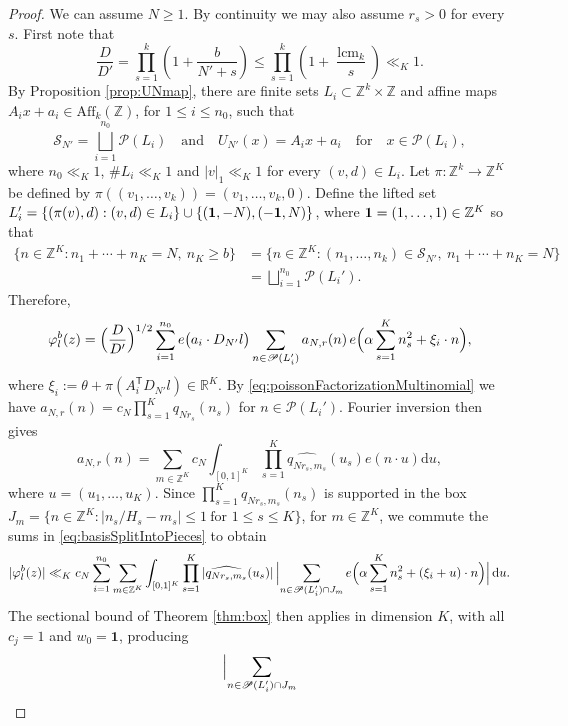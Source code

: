 \documentclass[a4paper,reqno,12pt]{amsart}
\theoremstyle{plain}
\theoremstyle{plain}
\theoremstyle{remark}
\theoremstyle{plain}
\newcommand{\cP}{\mathscr{P}}
\newcommand{\cS}{\mathscr{S}}
\newcommand{\RR}{\mathbb{R}}
\newcommand{\ft}{\widehat}
\newcommand{\al}{\alpha}
\newcommand{\dd}{\mathrm{d}}
\newcommand{\p}{\varphi}
\newcommand{\aff}{\text{Aff}}
\newcommand{\Z}{\mathbb{Z}}
\newcommand{\lcmk}{\operatorname{lcm}_k}
\theoremstyle{plain}
\theoremstyle{plain}
\begin{document}
{\begin{proof}{
We can assume $N\geq1$. {By continuity we may also assume $r_s>0$ for every $s$.}
First note that
\[
\frac{D}{D'}=\prod_{s=1}^k\left(1+\frac{b}{N'+s}\right)
\leq\prod_{s=1}^k\left(1+\frac{\lcmk}{s}\right)\ll_K1.
\]
By Proposition \ref{prop:UNmap}, there are
finite sets $L_i\subset\Z^k\times\Z$ and affine maps
$A_ix+a_i\in\aff_k(\Z)$, for $1\leq i\leq n_0$, such that
\[
\cS_{N'}=\bigsqcup_{i=1}^{n_0}\cP(L_i) \quad \text{and} \quad
U_{N'}(x)=A_ix+a_i\quad \text{for} \quad x\in\cP(L_i),
\]
where $n_0\ll_K1$, $\#L_i\ll_K1$ and $|v|_1\ll_K1$ for every $(v,d)\in L_i$. Let $\pi : \mathbb{Z}^k \rightarrow \mathbb{Z}^K$ be defined by $\pi((v_1, \ldots, v_k)) = (v_1, \ldots, v_k, 0)$.
Define the lifted set $L_i'=\{(\pi(v),d) : (v,d)\in L_i\}\cup {\{({\bf 1},-N),(-{\bf 1},N)\}}$, where ${\bf 1} = (1,\ldots, 1)\in {\Z^K}$ so that
\begin{align*}
\{ n \in \Z^K : n_1+\cdots+n_K=N,\ n_K\ge b\}
 & = \{ n \in \Z^K : (n_1,{\ldots},n_k)\in\cS_{N'},\ n_1+\cdots+n_K=N\} \\
 & = \bigsqcup_{i=1}^{n_0}\cP(L_i').
\end{align*}
Therefore,
\begin{align}
\p^b_{l}(z)=\Bigl(\frac D{D'}\Bigr)^{1/2}
\sum_{i=1}^{n_0}e\bigl(a_i\cdot D_{N'}l\bigr)
\sum_{{n\in\cP(L_i')}}
a_{N,r}(n)\,e\Bigl(\al\sum_{s=1}^Kn_s^2+\xi_i\cdot n\Bigr),
\label{eq:basisSplitIntoPieces}
\end{align}
where $\xi_i:=\theta+\pi(A_i^{\mathsf T}D_{N'}l)\in\RR^K$. By \eqref{eq:poissonFactorizationMultinomial} we have
$a_{N,r}(n)=c_N\prod_{s=1}^Kq_{Nr_s}(n_s)$
{for $n\in\cP(L_i')$}. Fourier inversion then gives
\[
a_{N,r}(n)=\sum_{m\in \Z^K} c_N  \int_{[0,1]^K}\prod_{s=1}^K \ft{q_{Nr_s,m_s}}(u_s) e(n\cdot u) \dd u,
\]
where $u=(u_1,\ldots,u_K)$. Since $\prod_{s=1}^K {q_{Nr_s,m_s}}(n_s)$ is supported in the box $J_m=\{n\in \Z^K : |n_s/H_s-m_s| \leq 1\ {\text{for }1\le s\le K}\}$, for $m\in \Z^K$, we commute the sums in \eqref{eq:basisSplitIntoPieces} {to obtain}
\begin{align}
|\p^b_{l}(z)|\ll_K c_N\sum_{i=1}^{n_0}\sum_{m\in\Z^K}
\int_{[0,1]^K}\prod_{s=1}^K|\ft{q_{Nr_s,m_s}}(u_s)|\,
\Bigl|\sum_{n\in \cP(L_i') \cap J_m}
e\Bigl(\al\sum_{s=1}^Kn_s^2+(\xi_i+u)\cdot n\Bigr)\Bigr|\,\dd u.
\end{align}
The sectional bound of Theorem \ref{thm:box} then applies in dimension $K$,
with all $c_j=1$ and $w_0=\mathbf1$, producing
\begin{align}
\Bigl|\sum_{n\in \cP(L_i') \cap J_m}

\end{align}}
\end{proof}}
\end{document}
